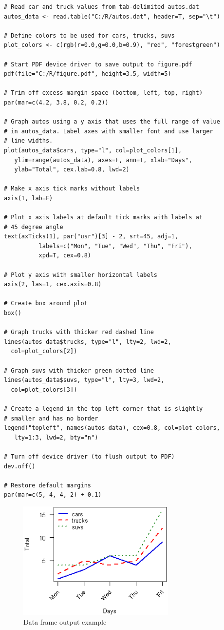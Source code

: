 \documentclass[10pt]{book}
\begin{document}
\begin{lstlisting}
# Read car and truck values from tab-delimited autos.dat
autos_data <- read.table("C:/R/autos.dat", header=T, sep="\t")

# Define colors to be used for cars, trucks, suvs
plot_colors <- c(rgb(r=0.0,g=0.0,b=0.9), "red", "forestgreen")

# Start PDF device driver to save output to figure.pdf
pdf(file="C:/R/figure.pdf", height=3.5, width=5)

# Trim off excess margin space (bottom, left, top, right)
par(mar=c(4.2, 3.8, 0.2, 0.2))

# Graph autos using a y axis that uses the full range of value
# in autos_data. Label axes with smaller font and use larger 
# line widths.
plot(autos_data$cars, type="l", col=plot_colors[1], 
   ylim=range(autos_data), axes=F, ann=T, xlab="Days",
   ylab="Total", cex.lab=0.8, lwd=2)

# Make x axis tick marks without labels
axis(1, lab=F)

# Plot x axis labels at default tick marks with labels at 
# 45 degree angle
text(axTicks(1), par("usr")[3] - 2, srt=45, adj=1,
          labels=c("Mon", "Tue", "Wed", "Thu", "Fri"),
          xpd=T, cex=0.8)

# Plot y axis with smaller horizontal labels 
axis(2, las=1, cex.axis=0.8)

# Create box around plot
box()

# Graph trucks with thicker red dashed line
lines(autos_data$trucks, type="l", lty=2, lwd=2, 
  col=plot_colors[2])

# Graph suvs with thicker green dotted line
lines(autos_data$suvs, type="l", lty=3, lwd=2, 
  col=plot_colors[3])

# Create a legend in the top-left corner that is slightly  
# smaller and has no border
legend("topleft", names(autos_data), cex=0.8, col=plot_colors, 
   lty=1:3, lwd=2, bty="n")

# Turn off device driver (to flush output to PDF)
dev.off()

# Restore default margins
par(mar=c(5, 4, 4, 2) + 0.1)
\end{lstlisting}

\begin{figure}[H]
    \begin{flushleft}
        \includegraphics[width=0.7\textwidth]{line_script6.png}
        \caption{Data frame output example}
        \label{fig:dataframe}
    \end{flushleft}
\end{figure}
\end{document}
